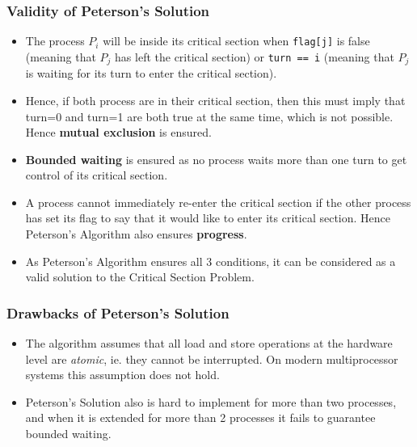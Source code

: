 \documentclass{article}
\theoremstyle{plain}
\theoremstyle{definition}
\begin{document}
\subsubsection{Validity of Peterson's Solution}
\begin{itemize}
    \item The process $P_i$ will be inside its critical section when \texttt{flag[j]} is false (meaning that $P_j$ has left the critical section) or \texttt{turn == i} (meaning that $P_j$ is waiting for its turn to enter the critical section). 
    
    \item Hence, if both process are in their critical section, then this must imply that turn=0 and turn=1 are both true at the same time, which is not possible. Hence \textbf{mutual exclusion} is ensured.
    
    \item \textbf{Bounded waiting} is ensured as no process waits more than one turn to get control of its critical section.
    
    \item  A process cannot immediately re-enter the critical section if the other process has set its flag to say that it would like to enter its critical section. Hence Peterson's Algorithm also ensures \textbf{progress}.
    
    \item As Peterson's Algorithm ensures all 3 conditions, it can be considered as a valid solution to the Critical Section Problem.
\end{itemize}

\subsubsection{Drawbacks of Peterson's Solution}
\begin{itemize}
    \item The algorithm assumes that all load and store operations at the hardware level are \textit{atomic}, ie. they cannot be interrupted. On modern multiprocessor systems this assumption does not hold.
    
    \item Peterson's Solution also is hard to implement for more than two processes, and when it is extended for more than 2 processes it fails to guarantee bounded waiting.
\end{itemize}
\end{document}
